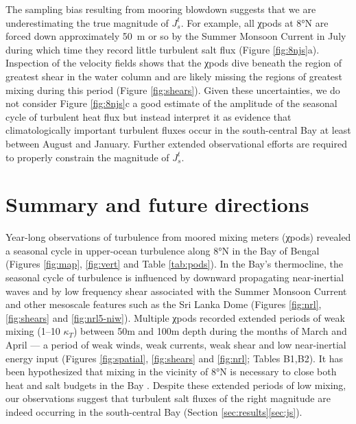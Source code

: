 \documentclass[onecol]{ametsoc}
\begin{document}
The sampling bias resulting from mooring blowdown suggests that we are underestimating the true magnitude of $J_s^t$.
For example, all χpods at 8°N are forced down approximately \SI{50}{m} or so by the Summer Monsoon Current in July during which time they record little turbulent salt flux (Figure \ref{fig:8njs}a).
Inspection of the velocity fields shows that the χpods dive beneath the region of greatest shear in the water column and are likely missing the regions of greatest mixing during this period (Figure \ref{fig:shears}).
Given these uncertainties, we do not consider Figure \ref{fig:8njs}c a good estimate of the amplitude of the seasonal cycle of turbulent heat flux but instead interpret it as evidence that climatologically important turbulent fluxes occur in the south-central Bay at least between August and January.
Further extended observational efforts are required to properly constrain the magnitude of $J_s^t$.

\section{Summary and future directions}
\label{sec:org3230bcc}

Year-long observations of turbulence from moored mixing meters (χpods) revealed a seasonal cycle in upper-ocean turbulence along 8°N in the Bay of Bengal (Figures \ref{fig:map}, \ref{fig:vert} and Table \ref{tab:pods}).
In the Bay's thermocline, the seasonal cycle of turbulence is influenced by downward propagating near-inertial waves and by low frequency shear associated with the Summer Monsoon Current and other mesoscale features such as the Sri Lanka Dome (Figures \ref{fig:nrl}, \ref{fig:shears} and \ref{fig:nrl5-niw}).
Multiple χpods recorded extended periods of weak mixing (1--10 \(κ_T\)) between 50m and 100m depth during the months of March and April --- a period of weak winds, weak currents, weak shear and low near-inertial energy input (Figures \ref{fig:spatial}, \ref{fig:shears} and \ref{fig:nrl}; Tables B1,B2).
It has been hypothesized that mixing in the vicinity of 8°N is necessary to close both heat and salt budgets in the Bay \citep{Shenoi2002,Vinayachandran2013,Wilson2016a}.
Despite these extended periods of low mixing, our observations suggest that turbulent salt fluxes of the right magnitude are indeed occurring in the south-central Bay (Section \ref{sec:results}\ref{sec:js}).
\end{document}
